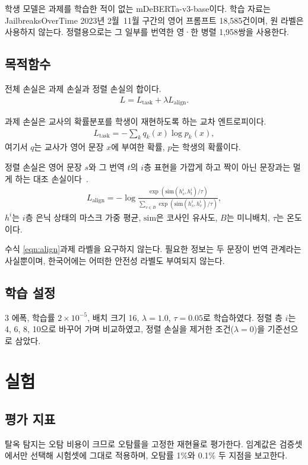 \documentclass[twocolumn, 10pt]{article}
\begin{document}
학생 모델은 과제를 학습한 적이 없는 mDeBERTa-v3-base이다.
학습 자료는 JailbreaksOverTime 2023년 2월~11월 구간의 영어 프롬프트 18{,}585건이며, 원 라벨은 사용하지 않는다.
정렬용으로는 그 일부를 번역한 영·한 병렬 1{,}958쌍을 사용한다.

\subsection{목적함수}
전체 손실은 과제 손실과 정렬 손실의 합이다.
\begin{eqnarray}
L = L_{\text{task}} + \lambda L_{\text{align}}. \label{eqn:total}
\end{eqnarray}

과제 손실은 교사의 확률분포를 학생이 재현하도록 하는 교차 엔트로피이다.
\begin{eqnarray}
L_{\text{task}} = -\sum_{k} q_k(x) \log p_k(x), \nonumber
\end{eqnarray}
여기서 $q$는 교사가 영어 문장 $x$에 부여한 확률, $p$는 학생의 확률이다.

정렬 손실은 영어 문장 $s$와 그 번역 $t$의 $i$층 표현을 가깝게 하고 짝이 아닌 문장과는 멀게 하는 대조 손실이다~\cite{liu:acl2025}.
\begin{eqnarray}
L_{\text{align}} = -\log \frac{\exp(\mathrm{sim}(h^i_s, h^i_t)/\tau)}{\sum_{v \in B} \exp(\mathrm{sim}(h^i_s, h^i_v)/\tau)}, \label{eqn:align}
\end{eqnarray}
$h^i$는 $i$층 은닉 상태의 마스크 가중 평균, $\mathrm{sim}$은 코사인 유사도, $B$는 미니배치, $\tau$는 온도이다.

수식 \eqref{eqn:align}\은 과제 라벨을 요구하지 않는다.
필요한 정보는 두 문장이 번역 관계라는 사실뿐이며, 한국어에는 어떠한 안전성 라벨도 부여되지 않는다.

\subsection{학습 설정}
3 에폭, 학습률 $2\times10^{-5}$, 배치 크기 16, $\lambda=1.0$, $\tau=0.05$로 학습하였다.
정렬 층 $i$는 4, 6, 8, 10으로 바꾸어 가며 비교하였고, 정렬 손실을 제거한 조건($\lambda=0$)을 기준선으로 삼았다.

\section{실험}

\subsection{평가 지표}
탈옥 탐지는 오탐 비용이 크므로 오탐률을 고정한 재현율로 평가한다.
임계값은 검증셋에서만 선택해 시험셋에 그대로 적용하며, 오탐률 1\%와 0.1\% 두 지점을 보고한다.
\end{document}
